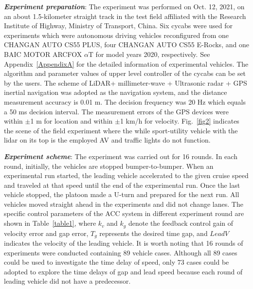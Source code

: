 \documentclass[journal]{IEEEtran}
\begin{document}
\textbf{\emph{Experiment preparation}}: The experiment was performed on Oct. 12, 2021, on an about 1.5-kilometer straight track in the test field affiliated with the Research Institute of Highway, Ministry of Transport, China. Six cycabs were used for experiments which were autonomous driving vehicles reconfigured from one CHANGAN AUTO CS55 PLUS, four CHANGAN AUTO CS55 E-Rocks, and one BAIC MOTOR ARCFOX $\alpha$T for model years 2020, respectively. See Appendix~\ref{AppendixA} for the detailed information of experimental vehicles. The algorithm and parameter values of upper level controller of the cycabs can be set by the users. The scheme of LiDAR+ millimeter-wave + Ultrasonic radar + GPS inertial navigation was adopted as the navigation system, and the distance measurement accuracy is 0.01 m. The decision frequency was 20 Hz which equals a 50 ms decision interval. The measurement errors of the GPS devices were within $\pm$1 m for location and within $\pm$1 km/h for velocity. Fig.~\ref{fig2} indicates the scene of the field experiment where the while sport-utility vehicle with the lidar on its top is the employed AV and traffic lights do not function.

\textbf{\emph{Experiment scheme}}: The experiment was carried out for 16 rounds. In each round, initially, the vehicles are stopped bumper-to-bumper. When an experimental run started, the leading vehicle accelerated to the given cruise speed and traveled at that speed until the end of the experimental run. Once the last vehicle stopped, the platoon made a U-turn and prepared for the next run. All vehicles moved straight ahead in the experiments and did not change lanes. The specific control parameters of the ACC system in different experiment round are shown in Table~\ref{table1}, where $k_{v}$ and $k_{g}$ denote the feedback control gain of velocity error and gap error, $T_{g}$ represents the desired time gap, and $LeadV$ indicates the velocity of the leading vehicle. It is worth noting that 16 rounds of experiments were conducted containing 89 vehicle cases. Although all 89 cases could be used to investigate the time delay of speed, only 73 cases could be adopted to explore the time delays of gap and lead speed because each round of leading vehicle did not have a predecessor.
\end{document}
